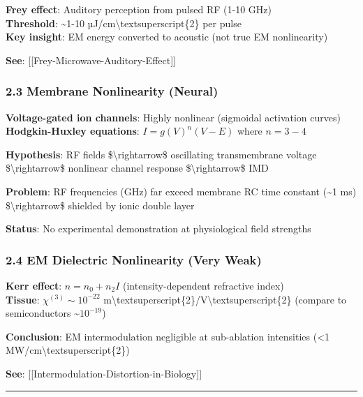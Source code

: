 \textbf{Frey effect}: Auditory perception from pulsed RF (1-10 GHz)\\
\textbf{Threshold}: \textasciitilde1-10
µJ/cm\textbackslash textsuperscript\{2\} per pulse\\
\textbf{Key insight}: EM energy converted to acoustic (not true EM
nonlinearity)

\textbf{See}: {[}{[}Frey-Microwave-Auditory-Effect{]}{]}

\subsubsection{\texorpdfstring{2.3 Membrane Nonlinearity
(Neural)}{2.3 Membrane Nonlinearity  (Neural)}}\label{membrane-nonlinearity-neural}

\textbf{Voltage-gated ion channels}: Highly nonlinear (sigmoidal
activation curves)\\
\textbf{Hodgkin-Huxley equations}: \(I = g(V)^n (V - E)\) where
\(n = 3-4\)

\textbf{Hypothesis}: RF fields \$\textbackslash rightarrow\$ oscillating
transmembrane voltage \$\textbackslash rightarrow\$ nonlinear channel
response \$\textbackslash rightarrow\$ IMD

\textbf{Problem}: RF frequencies (GHz) far exceed membrane RC time
constant (\textasciitilde1 ms) \$\textbackslash rightarrow\$ shielded by
ionic double layer

\textbf{Status}: No experimental demonstration at physiological field
strengths

\subsubsection{\texorpdfstring{2.4 EM Dielectric Nonlinearity (Very
Weak)}{2.4 EM Dielectric Nonlinearity  (Very Weak)}}\label{em-dielectric-nonlinearity-very-weak}

\textbf{Kerr effect}: \(n = n_0 + n_2 I\) (intensity-dependent
refractive index)\\
\textbf{Tissue}: \(\chi^{(3)} \sim 10^{-22}\)
m\textbackslash textsuperscript\{2\}/V\textbackslash textsuperscript\{2\}
(compare to semiconductors \textasciitilde{}\(10^{-19}\))

\textbf{Conclusion}: EM intermodulation negligible at sub-ablation
intensities (\textless1 MW/cm\textbackslash textsuperscript\{2\})

\textbf{See}: {[}{[}Intermodulation-Distortion-in-Biology{]}{]}

\begin{center}\rule{0.5\linewidth}{0.5pt}\end{center}

